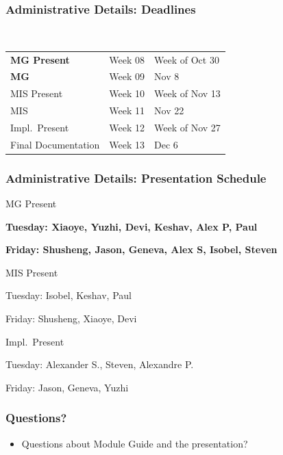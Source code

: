 \documentclass[t,12pt,numbers,fleqn]{beamer}
\begin{document}
\begin{frame}
\frametitle{Administrative Details: Deadlines}
~\newline
\begin{tabular}{l l l}
\textbf{MG Present} & Week 08 & Week of Oct 30\\
\textbf{MG} & Week 09 & Nov 8\\
MIS Present & Week 10 & Week of Nov 13\\
MIS & Week 11 & Nov 22\\
Impl.\ Present & Week 12 & Week of Nov 27\\
Final Documentation & Week 13 & Dec 6\\
\end {tabular}

\end{frame}


\begin{frame}
\frametitle{Administrative Details: Presentation Schedule}

\bi
\item MG Present
\bi
\item \textbf{Tuesday: Xiaoye, Yuzhi, Devi, Keshav, Alex P, Paul}
\item \textbf{Friday: Shusheng, Jason, Geneva, Alex S, Isobel, Steven}
\ei
\item MIS Present
\bi
\item Tuesday: Isobel, Keshav, Paul
\item Friday: Shusheng, Xiaoye, Devi
\ei
\item Impl.\ Present
\bi
\item Tuesday: Alexander S., Steven, Alexandre P.
\item Friday: Jason, Geneva, Yuzhi
\ei

\ei

\end{frame}


\begin{frame}
\frametitle{Questions?}
\begin{itemize}
\item Questions about Module Guide and the presentation?
\end{itemize}
\end{frame}

\end{document}
